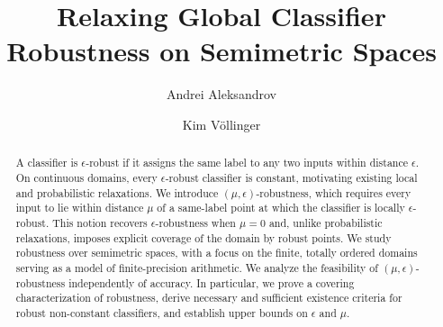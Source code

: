 \documentclass[runningheads]{llncs}
\begin{document}
%
\title{Relaxing Global Classifier Robustness on Semimetric Spaces}
%
%
\author{Andrei Aleksandrov \and
Kim Völlinger}
%
%
%
\maketitle              %
%
\begin{abstract}
A classifier is $\epsilon$-robust if it assigns the same label to any two inputs within distance $\epsilon$.
On continuous domains, every $\epsilon$-robust classifier is constant, motivating existing local and probabilistic relaxations.
We introduce $(\mu,\epsilon)$-robustness, which requires every input to lie within distance $\mu$ of a same-label point at which the classifier is locally $\epsilon$-robust. This notion recovers $\epsilon$-robustness when $\mu=0$ and, unlike probabilistic relaxations, imposes explicit coverage of the domain by robust points. We study robustness over semimetric spaces, with a focus on the finite, totally ordered domains serving as a model of finite-precision arithmetic. We analyze the feasibility of $(\mu,\epsilon)$-robustness independently of accuracy. In particular, we prove a covering characterization of robustness, derive necessary and sufficient existence criteria for robust non-constant classifiers, and establish upper bounds on $\epsilon$ and $\mu$. 

\end{abstract}









%
%
%
 
 
%
\end{document}
